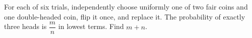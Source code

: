 For each of six trials, independently choose uniformly one of two fair coins and one double-headed coin, flip it once, and replace it. The probability of exactly three heads is $\dfrac{m}{n}$ in lowest terms. Find $m+n$.
